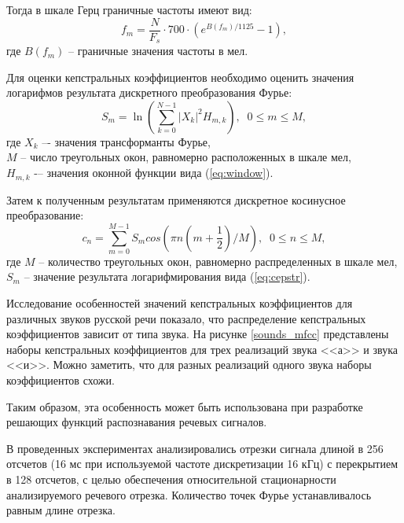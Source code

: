 \documentclass[a4paper,14pt,russian,utf8,nocolumnsxix,nocolumnxxxi,nocolumnxxxii]{eskdtext}
\begin{document}
Тогда в шкале Герц граничные частоты имеют вид:
\begin{equation}
f_m=\frac{N}{F_s}\cdot 700 \cdot (e^{B(f_m)/1125}-1),
\end{equation}
где  $B(f_m)$ -- граничные значения частоты в мел.

Для оценки кепстральных коэффициентов необходимо оценить значения логарифмов результата дискретного преобразования Фурье:
\begin{equation}
S_m=\ln(\sum_{k=0}^{N-1}|X_k|^2 H_{m,k}), \; \; 0\leq m \le M,
\label{eq:cepstr}
\end{equation}
где $X_k$ –- значения трансформанты Фурье,\\
$M$ – число треугольных окон, равномерно расположенных в шкале мел,\\
$H_{m,k}$ -– значения оконной функции вида (\ref{eq:window}).

Затем к полученным результатам применяются дискретное косинусное преобразование:
\begin{equation}
c_n=\sum_{m=0}^{M-1}S_m cos(\pi n(m+\frac{1}{2})/M), \; \; 0\leq n \le M,
\end{equation}
где  $M$ – количество треугольных окон, равномерно распределенных в шкале мел,\\
$S_m$ – значение результата логарифмирования вида (\ref{eq:cepstr}).

Исследование особенностей значений кепстральных коэффициентов для различных звуков русской речи показало, что распределение кепстральных коэффициентов зависит от типа звука. На рисунке \ref{sounds_mfcc} представлены наборы кепстральных коэффициентов для трех реализаций звука <<а>> и звука <<и>>. Можно заметить, что для разных реализаций одного звука наборы коэффициентов схожи.

Таким образом, эта особенность может быть использована при разработке решающих функций распознавания речевых сигналов.

В проведенных экспериментах анализировались отрезки сигнала длиной в 256 отсчетов (16 мс при используемой частоте дискретизации 16 кГц) с перекрытием в 128 отсчетов, с целью обеспечения относительной стационарности анализируемого речевого отрезка. Количество точек Фурье устанавливалось равным длине отрезка.
\pagebreak
\end{document}
